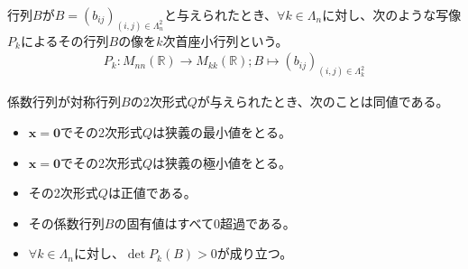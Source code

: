\documentclass[dvipdfmx]{jsarticle}
\begin{document}
\begin{dfn}\label{首座小行列}
行列$B$が$B = \left( b_{ij} \right)_{(i,j) \in \varLambda_{n}^{2}}$と与えられたとき、$\forall k \in \varLambda_{n}$に対し、次のような写像$P_{k}$によるその行列$B$の像を$k$次首座小行列という。
\begin{align*}
P_{k}:M_{nn}\left( \mathbb{R} \right) \rightarrow M_{kk}\left( \mathbb{R} \right);B \mapsto \left( b_{ij} \right)_{(i,j) \in \varLambda_{k}^{2}}
\end{align*}
\end{dfn}
\begin{thm}\label{4.4.3.8}
係数行列が対称行列$B$の2次形式$Q$が与えられたとき、次のことは同値である。
\begin{itemize}
\item
  $\mathbf{x} = \mathbf{0}$でその2次形式$Q$は狭義の最小値をとる。
\item
  $\mathbf{x} = \mathbf{0}$でその2次形式$Q$は狭義の極小値をとる。
\item
  その2次形式$Q$は正値である。
\item
  その係数行列$B$の固有値はすべて$0$超過である。
\item
  $\forall k \in \varLambda_{n}$に対し、$\det{P_{k}(B)} > 0$が成り立つ。
\end{itemize}
\end{thm}
\end{document}
